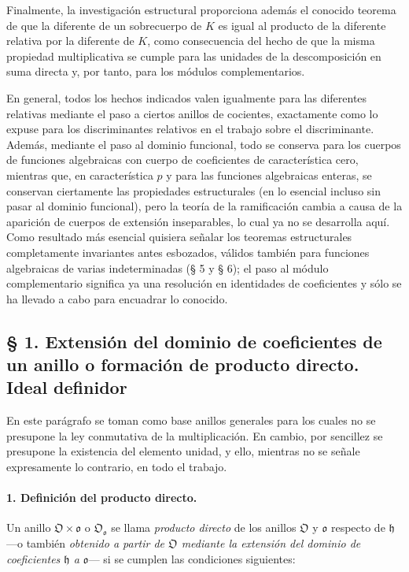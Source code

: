Finalmente, la investigación estructural proporciona además el conocido teorema de que la diferente de un sobrecuerpo de $K$ es igual al producto de la diferente relativa por la diferente de $K$, como consecuencia del hecho de que la misma propiedad multiplicativa se cumple para las unidades de la descomposición en suma directa y, por tanto, para los módulos complementarios.

En general, todos los hechos indicados valen igualmente para las diferentes relativas mediante el paso a ciertos anillos de cocientes, exactamente como lo expuse para los discriminantes relativos en el trabajo sobre el discriminante. Además, mediante el paso al dominio funcional, todo se conserva para los cuerpos de funciones algebraicas con cuerpo de coeficientes de característica cero, mientras que, en característica $p$ y para las funciones algebraicas enteras, se conservan ciertamente las propiedades estructurales (en lo esencial incluso sin pasar al dominio funcional), pero la teoría de la ramificación cambia a causa de la aparición de cuerpos de extensión inseparables, lo cual ya no se desarrolla aquí. Como resultado más esencial quisiera señalar los teoremas estructurales completamente invariantes antes esbozados, válidos también para funciones algebraicas de varias indeterminadas (§ 5 y § 6); el paso al módulo complementario significa ya una resolución en identidades de coeficientes y sólo se ha llevado a cabo para encuadrar lo conocido.
\subsection*{§ 1. Extensión del dominio de coeficientes de un anillo o formación de producto directo. Ideal definidor}

En este parágrafo se toman como base anillos generales para los cuales no se presupone la ley conmutativa de la multiplicación. En cambio, por sencillez se presupone la existencia del elemento unidad, y ello, mientras no se señale expresamente lo contrario, en todo el trabajo.

\paragraph{1. Definición del producto directo.}
Un anillo $\mathfrak O\times\mathfrak o$ o $\mathfrak O_{\mathfrak o}$ se llama \emph{producto directo} de los anillos $\mathfrak O$ y $\mathfrak o$ respecto de $\mathfrak h$ ---o también \emph{obtenido a partir de $\mathfrak O$ mediante la extensión del dominio de coeficientes $\mathfrak h$ a $\mathfrak o$}--- si se cumplen las condiciones siguientes:

